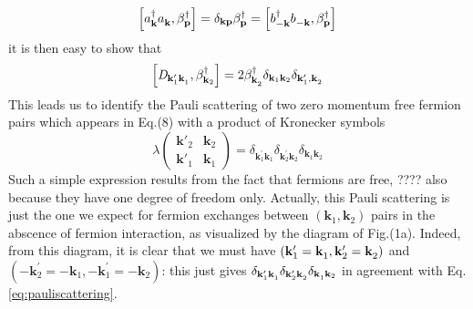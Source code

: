 \documentclass[aps,prb,superscriptaddress,showpacs,reprint,lengthcheck]{revtex4-1}
\newcommand{\vk}{\ensuremath{\mathbf{k}}}
\begin{document}
\begin{equation}  \label{eq:aBeta}
\left[a^{\dagger}_{\mathbf{k} }a^{}_{\mathbf{k} },\beta^{\dagger}_{\mathbf{p}
}\right]  =\delta_{\mathbf{k} \mathbf{p} }\beta^{\dagger}_{\mathbf{p} }=%
\left[b^{\dagger}_{-\mathbf{k} }b^{}_{-\mathbf{k} },\beta^{\dagger}_{\mathbf{%
p} }\right]  
\end{equation}
it is then easy to show that 
\begin{equation}  \label{eq:Dcom}
\left[\mathit{D} _{\mathbf{k} ^{\prime}_1\mathbf{k} ^{}_1},\beta^{\dagger}_{%
\mathbf{k} _2}\right]  =2\beta^{\dagger}_{\mathbf{k} ^{}_2}\delta_{\mathbf{k} _1%
\mathbf{k} _2}\delta_{\mathbf{k} ^{\prime}_1,\mathbf{k} ^{}_2}
\end{equation}
This leads us to identify the Pauli scattering of two zero momentum free fermion pairs which appears in Eq.(8) with a
product of Kronecker symbols 
\begin{equation}  \label{eq:pauliscattering}
\lambda\left(\begin{smallmatrix}\vk'_2&\vk_2\\\vk'_1&\vk_1\end{smallmatrix}%
\right)  =\delta_{\mathbf{k} ^{\prime}_1\mathbf{k} ^{}_1}\delta_{\mathbf{k}
^{\prime}_2\mathbf{k} ^{}_2}\delta_{\mathbf{k} ^{}_1\mathbf{k} ^{}_2}
\end{equation}
Such a simple expression results from the fact that fermions are free, ???? also because they have one degree of freedom only.
Actually, this Pauli scattering is just the one we expect for fermion exchanges between $\left(\mathbf{k} _1,\mathbf{k} _2\right) $ pairs in the abscence of fermion interaction,
as visualized by the diagram of Fig.(1a). Indeed, from this
diagram, it is clear that we must have $\left(\mathbf{k} ^{\prime}_1=\mathbf{%
k} ^{}_1,\mathbf{k} ^{\prime}_2=\mathbf{k} ^{}_2\right) $ and $\left(-\mathbf{k}
^{\prime}_2=-\mathbf{k} ^{}_1,-\mathbf{k} ^{\prime}_1=-\mathbf{k} ^{}_2\right) $:
this just gives $\delta_{\mathbf{k} ^{\prime}_1\mathbf{k} ^{}_1}\delta_{\mathbf{%
k} ^{\prime}_2\mathbf{k} ^{}_2}\delta_{\mathbf{k} ^{}_1\mathbf{k} _2}$ in
agreement with Eq.\eqref{eq:pauliscattering}.
\end{document}
